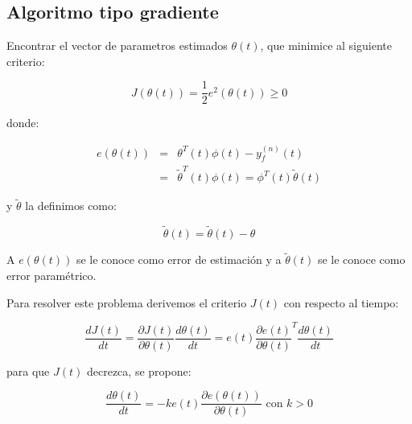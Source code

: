 
        \subsection{Algoritmo tipo gradiente}

            \begin{problema}
                Encontrar el vector de parametros estimados $\theta(t)$, que minimice al siguiente criterio:

                \begin{equation}
                    J \left( \theta(t) \right) = \frac{1}{2} e^2 \left( \theta(t) \right) \ge 0
                \end{equation}

                donde:

                \begin{eqnarray}
                    e \left( \theta(t) \right) & = & \theta^T(t) \phi(t) - y_f^{(n)}(t) \nonumber \\
                    & = & \tilde{\theta}^T(t) \phi(t) = \phi^T(t) \tilde{\theta}(t)
                \end{eqnarray}

                y $\tilde{\theta}$ la definimos como:

                \begin{equation}
                    \tilde{\theta}(t) = \tilde{\theta}(t) - \theta
                \end{equation}

                A $e \left( \theta(t) \right)$ se le conoce como error de estimación y a $\tilde{\theta}(t)$ se le conoce como error paramétrico.
            \end{problema}

            Para resolver este problema derivemos el criterio $J(t)$ con respecto al tiempo:

            \begin{equation} \label{eq:adap6}
                \frac{d J(t)}{dt} = \frac{\partial J(t)}{\partial \theta(t)} \frac{d \theta(t)}{dt} = e(t) \frac{\partial e(t)}{\partial \theta(t)}^T \frac{d \theta(t)}{dt}
            \end{equation}

            para que $J(t)$ decrezca, se propone:

            \begin{equation}\label{eq:adap7}
                \frac{d \theta(t)}{dt} = -k e(t) \frac{\partial e(\theta(t))}{\partial \theta(t)} \text{ con } k > 0
            \end{equation}

